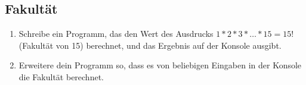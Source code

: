 \subsection{Fakultät }
\begin{enumerate}
    \item Schreibe ein Programm, das den Wert des Ausdrucks $1 * 2 * 3 * \ldots * 15 = 15!$ (Fakultät von 15) berechnet, und das Ergebnis auf der Konsole ausgibt.
    \item Erweitere dein Programm so, dass es von beliebigen Eingaben in der Konsole die Fakultät berechnet.
\end{enumerate}
